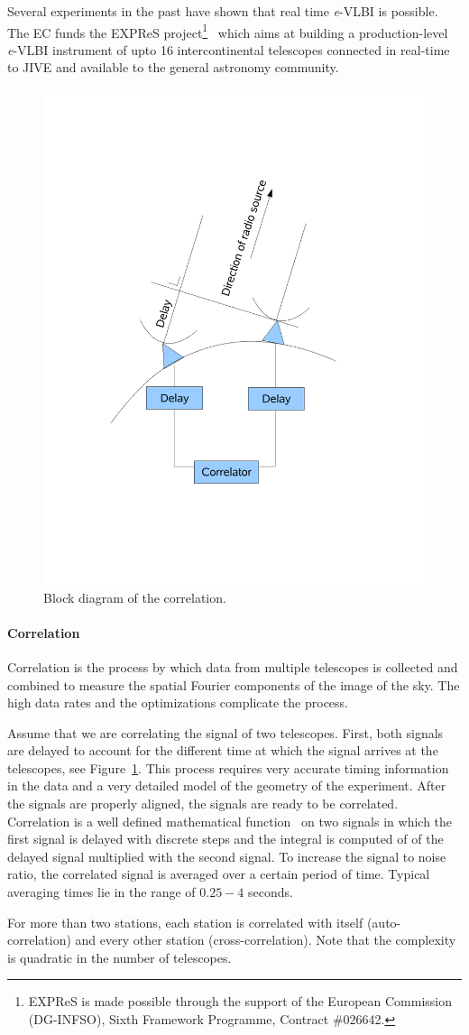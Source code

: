 Several experiments in the past have shown that real time {\it e}-VLBI
is possible. The EC funds the EXPReS project\footnote{EXPReS is made
  possible through the support of the European Commission (DG-INFSO),
  Sixth Framework Programme, Contract \#026642.}~\cite{EXPReS} which
aims at building a production-level {\it e}-VLBI instrument of upto 16
intercontinental telescopes connected in real-time to JIVE and
available to the general astronomy community.

\begin{figure}
  \centering
  \includegraphics[width=.75\textwidth]
  {img/VLBI}
  \caption{Block diagram of the correlation.}
  \label{fig:correlation_diagram}
\end{figure}
\paragraph{Correlation}
Correlation is the process by which data from multiple telescopes is
collected and combined to measure the spatial Fourier components of
the image of the sky. The high data rates and the optimizations
complicate the process.

Assume that we are correlating the signal of two telescopes. First,
both signals are delayed to account for the different time at which
the signal arrives at the telescopes, see
Figure~\ref{fig:correlation_diagram}.  This process requires very
accurate timing information in the data and a very detailed model of
the geometry of the experiment. After the signals are properly
aligned, the signals are ready to be correlated. Correlation is a well
defined mathematical function~\cite{def_correlation} on two signals in
which the first signal is delayed with discrete steps and the integral
is computed of of the delayed signal multiplied with the second
signal. To increase the signal to noise ratio, the correlated signal
is averaged over a certain period of time. Typical averaging times lie
in the range of $0.25-4$ seconds.

For more than two stations, each station is correlated with itself
(auto-correlation) and every other station (cross-correlation). Note
that the complexity is quadratic in the number of telescopes.


